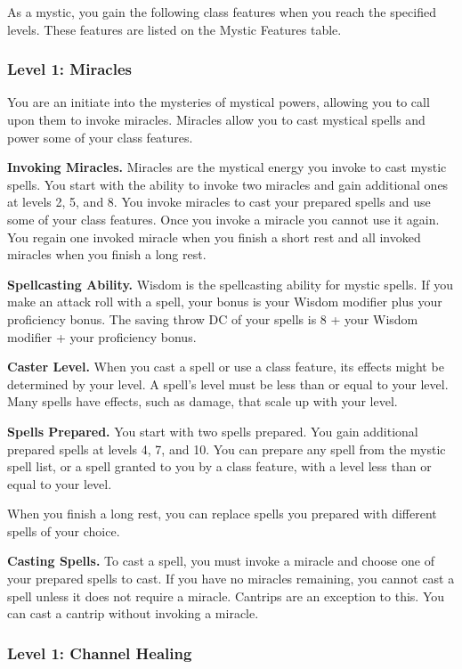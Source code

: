 \documentclass[12pt,letterpaper,twocolumn,openany,nodeprecatedcode,bg=none]{dndbook}
\begin{document}
As a mystic, you gain the following class features when you reach the
specified levels. These features are listed on the Mystic Features
table.

\subsubsection{Level 1: Miracles}\label{level-1-miracles}

You are an initiate into the mysteries of mystical powers, allowing you
to call upon them to invoke miracles. Miracles allow you to cast
mystical spells and power some of your class features.

\textbf{Invoking Miracles.} Miracles are the mystical energy you invoke
to cast mystic spells. You start with the ability to invoke two miracles
and gain additional ones at levels 2, 5, and 8. You invoke miracles to
cast your prepared spells and use some of your class features. Once you
invoke a miracle you cannot use it again. You regain one invoked miracle
when you finish a short rest and all invoked miracles when you finish a
long rest.

\textbf{Spellcasting Ability.} Wisdom is the spellcasting ability for
mystic spells. If you make an attack roll with a spell, your bonus is
your Wisdom modifier plus your proficiency bonus. The saving throw DC of
your spells is 8 + your Wisdom modifier + your proficiency bonus.

\textbf{Caster Level.} When you cast a spell or use a class feature, its
effects might be determined by your level. A spell's level must be less
than or equal to your level. Many spells have effects, such as damage,
that scale up with your level.

\textbf{Spells Prepared.} You start with two spells prepared. You gain
additional prepared spells at levels 4, 7, and 10. You can prepare any
spell from the mystic spell list, or a spell granted to you by a class
feature, with a level less than or equal to your level.

When you finish a long rest, you can replace spells you prepared with
different spells of your choice.

\textbf{Casting Spells.} To cast a spell, you must invoke a miracle and
choose one of your prepared spells to cast. If you have no miracles
remaining, you cannot cast a spell unless it does not require a miracle.
Cantrips are an exception to this. You can cast a cantrip without
invoking a miracle.

\subsubsection{Level 1: Channel Healing}\label{level-1-channel-healing}
\end{document}
